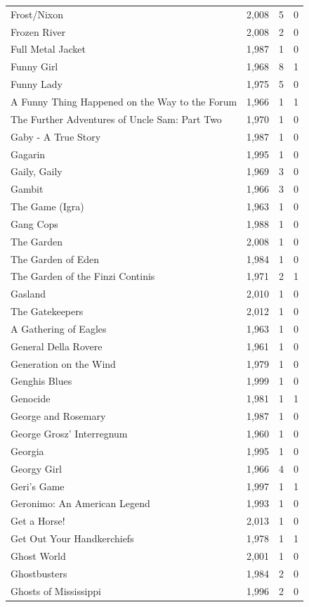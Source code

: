 \begin{tabular}{lrrr}
Frost/Nixon & 2,008 & 5 & 0 \\
Frozen River & 2,008 & 2 & 0 \\
Full Metal Jacket & 1,987 & 1 & 0 \\
Funny Girl & 1,968 & 8 & 1 \\
Funny Lady & 1,975 & 5 & 0 \\
A Funny Thing Happened on the Way to the Forum & 1,966 & 1 & 1 \\
The Further Adventures of Uncle Sam: Part Two & 1,970 & 1 & 0 \\
Gaby - A True Story & 1,987 & 1 & 0 \\
Gagarin & 1,995 & 1 & 0 \\
Gaily, Gaily & 1,969 & 3 & 0 \\
Gambit & 1,966 & 3 & 0 \\
The Game (Igra) & 1,963 & 1 & 0 \\
Gang Cops & 1,988 & 1 & 0 \\
The Garden & 2,008 & 1 & 0 \\
The Garden of Eden & 1,984 & 1 & 0 \\
The Garden of the Finzi Continis & 1,971 & 2 & 1 \\
Gasland & 2,010 & 1 & 0 \\
The Gatekeepers & 2,012 & 1 & 0 \\
A Gathering of Eagles & 1,963 & 1 & 0 \\
General Della Rovere & 1,961 & 1 & 0 \\
Generation on the Wind & 1,979 & 1 & 0 \\
Genghis Blues & 1,999 & 1 & 0 \\
Genocide & 1,981 & 1 & 1 \\
George and Rosemary & 1,987 & 1 & 0 \\
George Grosz' Interregnum & 1,960 & 1 & 0 \\
Georgia & 1,995 & 1 & 0 \\
Georgy Girl & 1,966 & 4 & 0 \\
Geri's Game & 1,997 & 1 & 1 \\
Geronimo: An American Legend & 1,993 & 1 & 0 \\
Get a Horse! & 2,013 & 1 & 0 \\
Get Out Your Handkerchiefs & 1,978 & 1 & 1 \\
Ghost World & 2,001 & 1 & 0 \\
Ghostbusters & 1,984 & 2 & 0 \\
Ghosts of Mississippi & 1,996 & 2 & 0 \\

\end{tabular}
